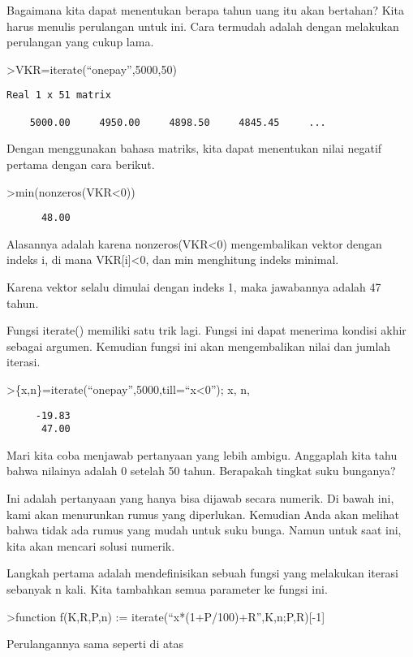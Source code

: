 \documentclass[
]{book}
\begin{document}
Bagaimana kita dapat menentukan berapa tahun uang itu akan bertahan? Kita harus menulis perulangan untuk ini. Cara termudah adalah dengan melakukan perulangan yang cukup lama.

\textgreater VKR=iterate(``onepay'',5000,50)

\begin{verbatim}
Real 1 x 51 matrix

    5000.00     4950.00     4898.50     4845.45     ...
\end{verbatim}

Dengan menggunakan bahasa matriks, kita dapat menentukan nilai negatif pertama dengan cara berikut.

\textgreater min(nonzeros(VKR\textless0))

\begin{verbatim}
      48.00 
\end{verbatim}

Alasannya adalah karena nonzeros(VKR\textless0) mengembalikan vektor dengan indeks i, di mana VKR{[}i{]}\textless0, dan min menghitung indeks minimal.

Karena vektor selalu dimulai dengan indeks 1, maka jawabannya adalah 47 tahun.

Fungsi iterate() memiliki satu trik lagi. Fungsi ini dapat menerima kondisi akhir sebagai argumen. Kemudian fungsi ini akan mengembalikan nilai dan jumlah iterasi.

\textgreater\{x,n\}=iterate(``onepay'',5000,till=``x\textless0''); x, n,

\begin{verbatim}
     -19.83 
      47.00 
\end{verbatim}

Mari kita coba menjawab pertanyaan yang lebih ambigu. Anggaplah kita tahu bahwa nilainya adalah 0 setelah 50 tahun. Berapakah tingkat suku bunganya?

Ini adalah pertanyaan yang hanya bisa dijawab secara numerik. Di bawah ini, kami akan menurunkan rumus yang diperlukan. Kemudian Anda akan melihat bahwa tidak ada rumus yang mudah untuk suku bunga. Namun untuk saat ini, kita akan mencari solusi numerik.

Langkah pertama adalah mendefinisikan sebuah fungsi yang melakukan iterasi sebanyak n kali. Kita tambahkan semua parameter ke fungsi ini.

\textgreater function f(K,R,P,n) := iterate(``x*(1+P/100)+R'',K,n;P,R){[}-1{]}

Perulangannya sama seperti di atas
\end{document}
